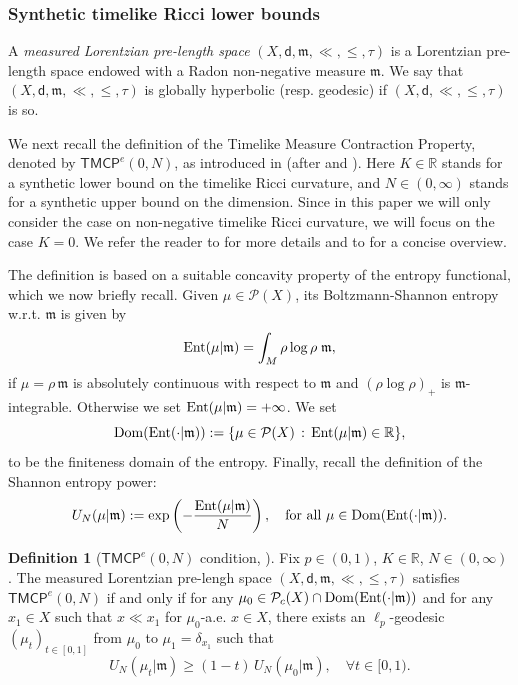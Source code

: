 \documentclass[a4paper,10pt]{article}
\newcommand{\R}{\mathbb{R}}
\newcommand{\Ent}{{\rm Ent}}
\newcommand{\Dom}{{\rm Dom}}
\newcommand{\Prob}{\mathcal P}
\newcommand{\TMCP}{\mathsf{TMCP}}
\newcommand{\mm}{\mathfrak m}
\newcommand{\sfd}{\mathsf d}
\theoremstyle{plain}
\theoremstyle{definition}
\newtheorem{definition}[lemma]{Definition}
\numberwithin{equation}{section}
\begin{document}
\subsubsection{Synthetic timelike Ricci lower bounds}




A \emph{measured Lorentzian pre-length space} $(X,\sfd, \mm, \ll, \leq, \tau)$ is a Lorentzian pre-length space endowed with a Radon non-negative measure $\mm$. We say that $(X,\sfd, \mm, \ll, \leq, \tau)$ is globally hyperbolic (resp. geodesic) if $(X,\sfd, \ll, \leq, \tau)$ is so.


\smallskip
We next recall the definition of the Timelike Measure Contraction Property, denoted by $\TMCP^{e}(0,N)$, as introduced in \cite{CaMo:20} (after \cite{McCann} and \cite{MoSu}). Here $K\in \R$ stands for a synthetic lower bound on the timelike Ricci curvature, and $N\in (0,\infty)$ stands for a synthetic upper bound on the dimension. Since in this paper we will only consider the case on non-negative timelike Ricci curvature, we will focus on the case $K=0$. We refer the reader to \cite{CaMo:20} for more details and to \cite{CaMo:22} for a concise overview. 

The definition is based on a suitable concavity property of the entropy functional, which we now briefly recall. Given $\mu \in \mathcal{P}(X)$,
its Boltzmann-Shannon entropy w.r.t. $\mm$ is given by
%
$$
\Ent(\mu|\mm) = \int_{M} \rho \log\rho \; \mm,
$$
%
if $\mu = \rho \, \mm$ is absolutely continuous with respect to $\mm$ and $(\rho\log \rho)_{+}$ is  $\mm$-integrable. 
Otherwise we set $\Ent(\mu|\mm) = +\infty$.
%
We set  $$\Dom(\Ent(\cdot|\mm)):=\{\mu\in \mathcal{P}(X)\,:\, \Ent(\mu|\mm)\in \R\},$$ to be the finiteness domain of the entropy.  Finally, recall the definition of the  Shannon entropy power:
%
\begin{equation}\label{eq:defSN}
U_{N}(\mu|\mm) : = \exp\left(-\frac{\Ent(\mu|\mm)}{N} \right), \quad \text{for all } \mu\in \Dom(\Ent(\cdot|\mm)).
\end{equation}


\begin{definition}[$\mathsf{TMCP}^{e}(0,N)$ condition, \cite{CaMo:20}]\label{def:TMCP}
Fix $p\in (0,1)$, $K\in \R$, $N\in (0,\infty)$. The measured Lorentzian pre-lengh space $(X,\sfd, \mm, \ll, \leq, \tau)$ satisfies $\mathsf{TMCP}^{e}(0,N)$ if and only if  for any $\mu_{0}\in \Prob_{c}(X)\cap \Dom(\Ent(\cdot|\mm))$ and for any $x_{1}\in X$
such that  $x\ll x_{1}$ for $\mu_{0}$-a.e. $x\in X$, there exists an $\ell_{p}$-geodesic $(\mu_{t})_{t\in [0,1]}$ from $\mu_{0}$ to  $\mu_{1}=\delta_{x_{1}}$
such that 
%
\begin{equation}\label{eq:defTMCP(0N)}
U_{N}(\mu_{t}|\mm) \geq (1-t)\, U_{N}(\mu_{0}|\mm), \quad \forall t\in [0,1).
\end{equation}
\end{definition}
\end{document}
